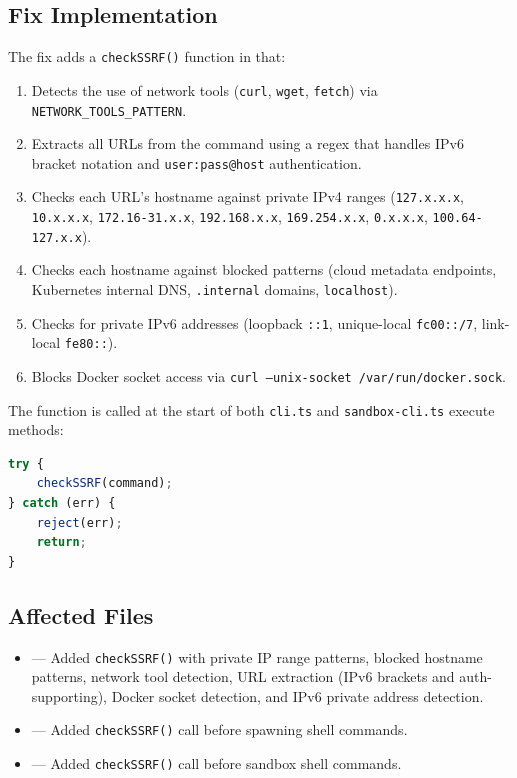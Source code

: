 \subsection*{Fix Implementation}
The fix adds a \texttt{checkSSRF()} function in  that:

\begin{enumerate}
    \item Detects the use of network tools (\texttt{curl}, \texttt{wget}, \texttt{fetch}) via \texttt{NETWORK\_TOOLS\_PATTERN}.
    \item Extracts all URLs from the command using a regex that handles IPv6 bracket notation and \texttt{user:pass@host} authentication.
    \item Checks each URL's hostname against private IPv4 ranges (\texttt{127.x.x.x}, \texttt{10.x.x.x}, \texttt{172.16-31.x.x}, \texttt{192.168.x.x}, \texttt{169.254.x.x}, \texttt{0.x.x.x}, \texttt{100.64-127.x.x}).
    \item Checks each hostname against blocked patterns (cloud metadata endpoints, Kubernetes internal DNS, \texttt{.internal} domains, \texttt{localhost}).
    \item Checks for private IPv6 addresses (loopback \texttt{::1}, unique-local \texttt{fc00::/7}, link-local \texttt{fe80::}).
    \item Blocks Docker socket access via \texttt{curl --unix-socket /var/run/docker.sock}.
\end{enumerate}

The function is called at the start of both \texttt{cli.ts} and \texttt{sandbox-cli.ts} execute methods:

\begin{lstlisting}[language=TypeScript]
try {
    checkSSRF(command);
} catch (err) {
    reject(err);
    return;
}
\end{lstlisting}

\subsection*{Affected Files}
\begin{itemize}
    \item {} --- Added \texttt{checkSSRF()} with private IP range patterns, blocked hostname patterns, network tool detection, URL extraction (IPv6 brackets and auth-supporting), Docker socket detection, and IPv6 private address detection.
    \item {} --- Added \texttt{checkSSRF()} call before spawning shell commands.
    \item {} --- Added \texttt{checkSSRF()} call before sandbox shell commands.
\end{itemize}

